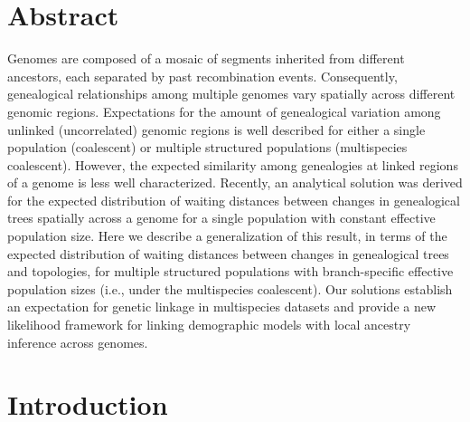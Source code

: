 \documentclass[11pt]{article}
\begin{document}
\section*{Abstract}
Genomes are composed of a mosaic of segments inherited from different ancestors, 
each separated by past recombination events. Consequently, genealogical
relationships among multiple genomes vary spatially across different genomic 
regions. Expectations for the amount of genealogical variation among unlinked 
(uncorrelated) genomic regions is well described for either a single 
population (coalescent) or multiple structured populations (multispecies coalescent).
However, the expected similarity among genealogies at linked regions of a 
genome is less well characterized. 
Recently, an analytical solution was derived for the expected 
distribution of waiting distances between changes in genealogical trees 
spatially across a genome for a single population with constant effective 
population size. Here we describe a generalization of this 
result, in terms of the expected distribution of waiting distances between 
changes in genealogical trees and topologies, for multiple structured populations
with branch-specific effective population sizes (i.e., under the multispecies 
coalescent). Our solutions establish an expectation for genetic linkage  
in multispecies datasets and provide a new likelihood framework for linking
demographic models with local ancestry inference across genomes.

\section{Introduction}

\end{document}
